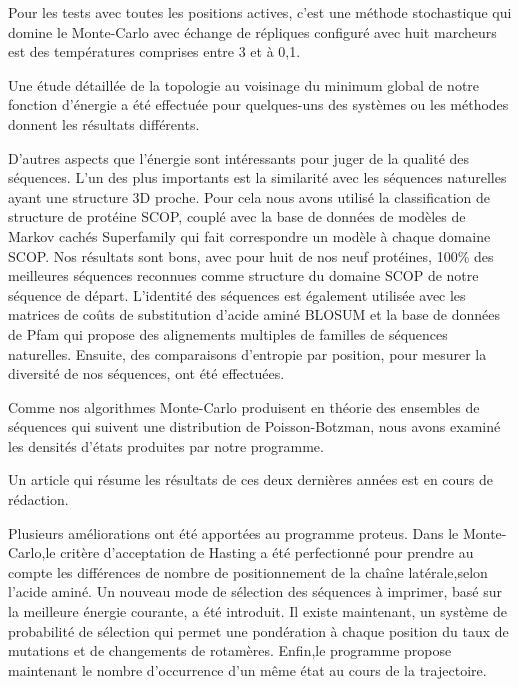 \documentclass[a4paper,11pt]{article}
\begin{document}
\begin{spacing}{1.0}
Pour les tests avec toutes les positions actives, c'est une méthode stochastique qui domine le Monte-Carlo avec échange de répliques configuré avec huit marcheurs est des températures comprises entre 3 et à 0,1.

Une étude détaillée de la topologie au voisinage du minimum global de notre fonction d'énergie a été effectuée pour quelques-uns des systèmes ou les méthodes donnent les résultats différents. 

D'autres aspects que l'énergie sont intéressants pour juger de la qualité des séquences. L'un des plus importants est la similarité  avec les séquences naturelles ayant une  structure 3D proche. Pour cela nous avons utilisé la classification de structure de protéine SCOP, couplé avec la base de données de modèles de Markov cachés Superfamily qui fait correspondre un modèle à chaque domaine SCOP. Nos résultats sont bons, avec pour huit de nos neuf protéines, 100\% des meilleures séquences  reconnues comme structure du domaine SCOP de notre séquence de départ.
\clearpage
L'identité des séquences est également utilisée avec les matrices de coûts de substitution d'acide aminé BLOSUM et la base de données de Pfam qui propose des alignements multiples de familles de séquences naturelles. Ensuite, des comparaisons d'entropie par position, pour mesurer la diversité de nos séquences, ont été effectuées.

Comme nos algorithmes Monte-Carlo produisent en théorie des ensembles de séquences qui suivent une distribution de Poisson-Botzman, nous avons examiné les densités d'états produites par notre programme.

Un article qui résume les résultats de ces deux dernières années est en cours de rédaction.
\newline

Plusieurs améliorations ont été apportées au programme proteus. Dans le Monte-Carlo,le critère d'acceptation de Hasting a été perfectionné pour prendre au compte les différences de nombre de positionnement de la chaîne latérale,selon l'acide aminé. Un nouveau mode de sélection des séquences à imprimer, basé sur la meilleure énergie courante, a été introduit. Il existe maintenant, un système de probabilité de sélection qui permet une pondération à chaque position du taux de mutations et de changements de rotamères. Enfin,le programme propose maintenant le nombre d'occurrence d'un même état au cours de la trajectoire.  


 

\end{spacing}
\end{document}
